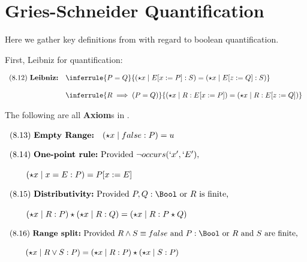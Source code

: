 \chapter{Gries-Schneider Quantification}

Here we gather key definitions from \cite{gries.93} 
with regard to boolean quantification.

First, Leibniz for quantification:

$\begin{array}{l@{\quad}l}
   (8.12)~\textbf{Leibniz:}
   &
   \inferrule
     {P = Q}
     {(\star x \mid E[x:=P] : S) = (\star x \mid E[z:=Q] : S)}
\\
\\ &
   \inferrule
     {R \implies (P=Q)}
     {(\star x \mid R : E[x:=P]) = (\star x \mid R : E[z:=Q])}
\end{array}$\newline\newline

The following are all \textbf{Axiom}s in \cite{gries.93}.

$\begin{array}{l@{\quad}l}
   (8.13)~\textbf{Empty Range:}
   &
   ( \star x \mid false : P) = u
\end{array}$\newline\newline

$\begin{array}{l@{\quad}l}
   (8.14)~\textbf{One-point rule:} \text{ Provided } \lnot occurs(`x',`E'),
\\ \\ \qquad 
   (\star x\mid x= E : P) = P[x:=E] \quad 
\end{array}$\newline\newline

$\begin{array}{l@{\quad}l}
   (8.15)~\textbf{Distributivity:} 
   \text{ Provided }P,Q:\Bool \text{ or } R \text{ is finite,}
\\ \\ \qquad
   (\star x \mid R : P) \star (\star x \mid R :Q) 
   = (\star x \mid R : P \star Q)
\end{array}$\newline\newline

$\begin{array}{l@{\quad}l}
   (8.16)~\textbf{Range split:}
   \text{ Provided } R \land S \equiv false
     \text{ and } P:\Bool \text{ or } R \text{ and } S \text{ are finite,}
\\ \\ \qquad
   (\star x \mid R \lor S : P)
   = (\star x \mid R : P) \star (\star x \mid S : P)
\end{array}$\newline\newline


